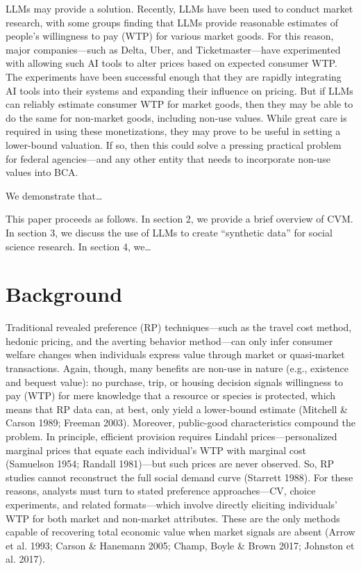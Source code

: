 \documentclass[12pt]{article}
\begin{document}
LLMs may provide a solution. Recently, LLMs have been used to conduct market research, with some groups finding that LLMs provide reasonable estimates of people’s willingness to pay (WTP) for various market goods. For this reason, major companies—such as Delta, Uber, and Ticketmaster—have experimented with allowing such AI tools to alter prices based on expected consumer WTP. The experiments have been successful enough that they are rapidly integrating AI tools into their systems and expanding their influence on pricing. But if LLMs can reliably estimate consumer WTP for market goods, then they may be able to do the same for non-market goods, including non-use values. While great care is required in using these monetizations, they may prove to be useful in setting a lower-bound valuation. If so, then this could solve a pressing practical problem for federal agencies—and any other entity that needs to incorporate non-use values into BCA.

We demonstrate that…  

This paper proceeds as follows. In section 2, we provide a brief overview of CVM. In section 3, we discuss the use of LLMs to create “synthetic data” for social science research. In section 4, we…

\section{Background}
Traditional revealed preference (RP) techniques—such as the travel cost method, hedonic pricing, and the averting behavior method—can only infer consumer welfare changes when individuals express value through market or quasi-market transactions. Again, though, many benefits are non-use in nature (e.g., existence and bequest value): no purchase, trip, or housing decision signals willingness to pay (WTP) for mere knowledge that a resource or species is protected, which means that RP data can, at best, only yield a lower-bound estimate (Mitchell \& Carson 1989; Freeman 2003). Moreover, public-good characteristics compound the problem. In principle, efficient provision requires Lindahl prices—personalized marginal prices that equate each individual’s WTP with marginal cost (Samuelson 1954; Randall 1981)—but such prices are never observed. So, RP studies cannot reconstruct the full social demand curve (Starrett 1988). For these reasons, analysts must turn to stated preference approaches—CV, choice experiments, and related formats—which involve directly eliciting individuals’ WTP for both market and non-market attributes. These are the only methods capable of recovering total economic value when market signals are absent (Arrow et al. 1993; Carson \& Hanemann 2005; Champ, Boyle \& Brown 2017; Johnston et al. 2017).
\end{document}
